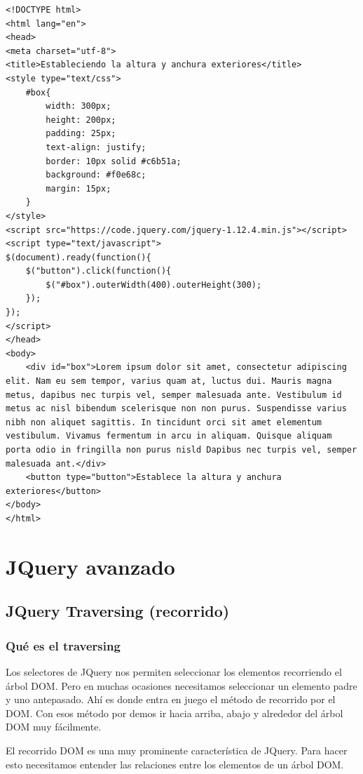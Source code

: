 \documentclass[11pt]{article}
\begin{document}
\begin{verbatim}
<!DOCTYPE html>
<html lang="en">
<head>
<meta charset="utf-8">
<title>Estableciendo la altura y anchura exteriores</title>
<style type="text/css">
    #box{
        width: 300px;
        height: 200px;
        padding: 25px;
        text-align: justify;
        border: 10px solid #c6b51a;
        background: #f0e68c;
        margin: 15px;
    }        
</style>
<script src="https://code.jquery.com/jquery-1.12.4.min.js"></script>
<script type="text/javascript">
$(document).ready(function(){
    $("button").click(function(){
        $("#box").outerWidth(400).outerHeight(300);
    });
});
</script>
</head>
<body>
    <div id="box">Lorem ipsum dolor sit amet, consectetur adipiscing elit. Nam eu sem tempor, varius quam at, luctus dui. Mauris magna metus, dapibus nec turpis vel, semper malesuada ante. Vestibulum id metus ac nisl bibendum scelerisque non non purus. Suspendisse varius nibh non aliquet sagittis. In tincidunt orci sit amet elementum vestibulum. Vivamus fermentum in arcu in aliquam. Quisque aliquam porta odio in fringilla non purus nisld Dapibus nec turpis vel, semper malesuada ant.</div>
    <button type="button">Establece la altura y anchura exteriores</button>
</body>
</html>                                		
\end{verbatim}

\section*{JQuery avanzado}
\label{sec:orgedee325}

\subsection*{JQuery Traversing (recorrido)}
\label{sec:org1c10c6d}

\subsubsection*{Qué es el traversing}
\label{sec:org9a201a9}

Los selectores de JQuery nos permiten seleccionar los elementos recorriendo el árbol DOM. Pero en muchas ocasiones necesitamos seleccionar un elemento padre y uno antepasado. Ahí es donde entra en juego el método de recorrido por el DOM. Con esos método por demos ir hacia arriba, abajo y alrededor del árbol DOM muy fácilmente. 

El recorrido DOM es una muy prominente característica de JQuery. Para hacer esto necesitamos entender las relaciones entre los elementos de un árbol DOM. 
\end{document}
